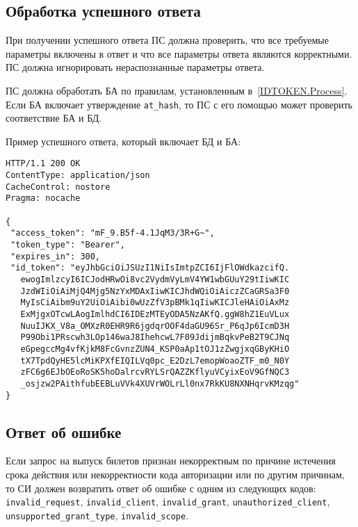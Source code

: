 \subsection{Обработка успешного ответа}\label{REQRESP.Token.Resp}

При получении успешного ответа ПС должна проверить, что все
требуемые параметры включены в ответ и что все параметры ответа являются
корректными. ПС должна игнорировать нераспознанные параметры ответа.

ПС должна обработать БА по правилам, установленным в~\ref{IDTOKEN.Process}.
%
Если БА включает утверждение \lstinline{at_hash}, то ПС с его помощью 
может проверить соответствие БА и БД.

Пример успешного ответа, который включает БД и БА:
%
\begin{lstlisting}
HTTP/1.1 200 OK
ContentType: application/json
CacheControl: nostore
Pragma: nocache

{
 "access_token": "mF_9.B5f-4.1JqM3/3R+G~",
 "token_type": "Bearer",
 "expires_in": 300,
 "id_token": "eyJhbGciOiJSUzI1NiIsImtpZCI6IjFlOWdkazcifQ.
   ewogImlzcyI6ICJodHRwOi8vc2VydmVyLmV4YW1wbGUuY29tIiwKIC
   JzdWIiOiAiMjQ4Mjg5NzYxMDAxIiwKICJhdWQiOiAiczZCaGRSa3F0
   MyIsCiAibm9uY2UiOiAibi0wUzZfV3pBMk1qIiwKICJleHAiOiAxMz
   ExMjgxOTcwLAogImlhdCI6IDEzMTEyODA5NzAKfQ.ggW8hZ1EuVLux
   NuuIJKX_V8a_OMXzR0EHR9R6jgdqrOOF4daGU96Sr_P6qJp6IcmD3H
   P99Obi1PRscwh3LOp146waJ8IhehcwL7F09JdijmBqkvPeB2T9CJNq
   eGpegccMg4vfKjkM8FcGvnzZUN4_KSP0aAp1tOJ1zZwgjxqGByKHiO
   tX7TpdQyHE5lcMiKPXfEIQILVq0pc_E2DzL7emopWoaoZTF_m0_N0Y
   zFC6g6EJbOEoRoSK5hoDalrcvRYLSrQAZZKflyuVCyixEoV9GfNQC3
   _osjzw2PAithfubEEBLuVVk4XUVrWOLrLl0nx7RkKU8NXNHqrvKMzqg"
}
\end{lstlisting}

\subsection{Ответ об ошибке}\label{REQRESP.Token.Error}

Если запрос на выпуск билетов признан некорректным по причине 
истечения срока действия или некорректности кода авторизации
или по другим причинам, то СИ должен возвратить ответ об ошибке с одним из 
следующих кодов:
\lstinline{invalid_request}, %
\lstinline{invalid_client}, %
\lstinline{invalid_grant}, %
\lstinline{unauthorized_client}, %
\lstinline{unsupported_grant_type}, %
\lstinline{invalid_scope}. %
